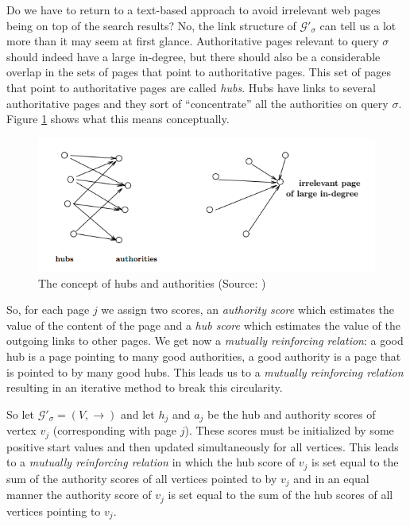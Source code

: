 \documentclass[a4paper,11pt]{report}
\newcommand{\graf}{\mathscr{G}}
\begin{document}
 Do we have to return to a text-based approach to avoid irrelevant web pages 
 being on top of the search results? No, the link structure of $\graf'_\sigma$ 
 can tell us a lot more than it may seem at first glance.  Authoritative pages 
 relevant to query $\sigma$ should indeed have a large in-degree, but there should also be a considerable overlap in the sets 
 of pages that point to authoritative pages. This set of pages that point to 
 authoritative pages are called \textit{hubs}. Hubs have links to several 
 authoritative pages and they sort of ``concentrate'' all the authorities on 
 query $\sigma$. Figure \ref{hubauth} shows what this means conceptually.
 \begin{figure}[h!]
  \centering
  \includegraphics[scale=0.6]{hubauth.png}\caption{The concept of hubs and authorities (Source: \cite{kleinberg})}\label{hubauth}
\end{figure}
 
 So, for each page $j$ we assign two scores, an \textit{authority score} 
 which estimates the value of the content of the page and a \textit{hub 
 score} which estimates the value of the outgoing links to other pages. We get now a\textit{ mutually reinforcing 
 relation}: a good hub is a page pointing to many good authorities, a good 
 authority is a page that is pointed to by many good hubs. This leads us to a 
 \textit{mutually reinforcing relation} resulting in an iterative method to 
 break this circularity.
 
So let $\graf'_\sigma = (V,\to)$ and let $h_j$ and $a_j$ be the hub and authority 
scores of vertex $v_j$ (corresponding with page $j$). These scores must be initialized by some positive start values 
and then updated simultaneously for all vertices. This leads to a \emph{mutually reinforcing relation} 
in which the hub score of $v_j$ is set equal to the sum of the authority scores of all 
vertices pointed to by $v_j$ and in an equal manner the authority score of $v_j$ 
is set equal to the sum of the hub scores of all vertices pointing to $v_j$.
\end{document}
